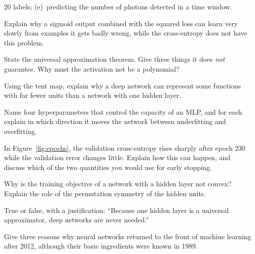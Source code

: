 \documentclass[11pt]{article}
\begin{document}
\begin{questions}
\begin{conceptual}
  20 labels; (e)~predicting the number of photons detected in a time window.
\item Explain why a sigmoid output combined with the squared loss can learn very slowly from examples it gets badly wrong,
  while the cross-entropy does not have this problem.
\item State the universal approximation theorem. Give three things it does \emph{not} guarantee. Why must the activation
  not be a polynomial?
\item Using the tent map, explain why a deep network can represent some functions with far fewer units than a network
  with one hidden layer.
\item Name four hyperparameters that control the capacity of an MLP, and for each explain in which direction it moves
  the network between underfitting and overfitting.
\item In Figure~\ref{fig:epochs}, the validation cross-entropy rises sharply after epoch $230$ while the validation error
  changes little. Explain how this can happen, and discuss which of the two quantities you would use for early
  stopping.
\item Why is the training objective of a network with a hidden layer not convex? Explain the role of the permutation
  symmetry of the hidden units.
\item True or false, with a justification: ``Because one hidden layer is a universal approximator, deep networks are
  never needed.''
\item Give three reasons why neural networks returned to the front of machine learning after 2012, although their basic
  ingredients were known in 1989.
\end{conceptual}


\end{questions}
\end{document}
